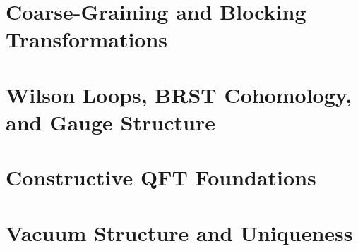 \documentclass[11pt,a4paper]{report}
\begin{document}
\chapter{Coarse-Graining and Blocking Transformations}
\label{ch:blocking}



\chapter{Wilson Loops, BRST Cohomology, and Gauge Structure}
\label{ch:wilson-brst}





\chapter{Constructive QFT Foundations}
\label{ch:constructive-qft}





\chapter{Vacuum Structure and Uniqueness}
\label{ch:vacuum}




\end{document}
